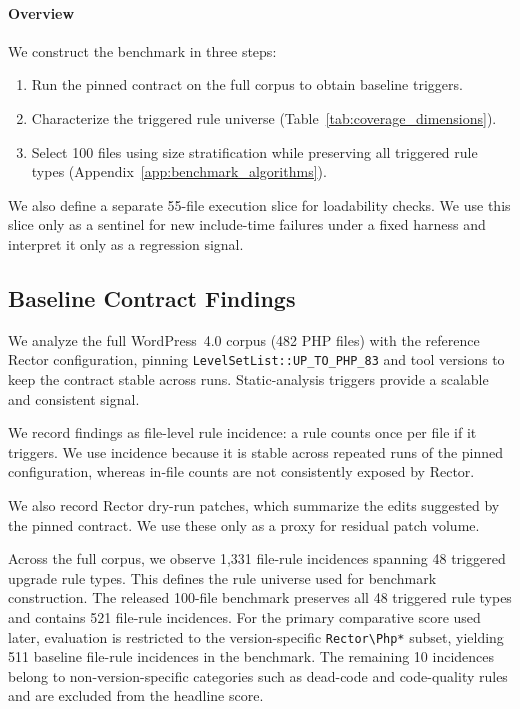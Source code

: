 \paragraph*{Overview}
We construct the benchmark in three steps:
\begin{enumerate}
\item Run the pinned contract on the full corpus to obtain baseline triggers.
\item Characterize the triggered rule universe (Table~\ref{tab:coverage_dimensions}).
\item Select 100 files using size stratification while preserving all triggered rule types (Appendix~\ref{app:benchmark_algorithms}).
\end{enumerate}

We also define a separate 55-file execution slice for loadability checks. We use this slice only as a sentinel for new include-time failures under a fixed harness and interpret it only as a regression signal.



\subsection{Baseline Contract Findings}
\label{sec:benchmark_static_analysis}

We analyze the full WordPress~4.0 corpus (482 PHP files) with the reference Rector configuration, pinning \texttt{LevelSetList::UP\_TO\_PHP\_83} and tool versions to keep the contract stable across runs. Static-analysis triggers provide a scalable and consistent signal.\cite{bessey2010billion,calcagno2015moving}

We record findings as file-level rule incidence: a rule counts once per file if it triggers. We use incidence because it is stable across repeated runs of the pinned configuration, whereas in-file counts are not consistently exposed by Rector.

We also record Rector dry-run patches, which summarize the edits suggested by the pinned contract. We use these only as a proxy for residual patch volume.\cite{falleri2014fine,fluri2007change}

Across the full corpus, we observe 1{,}331 file-rule incidences spanning 48 triggered upgrade rule types. This defines the rule universe used for benchmark construction. The released 100-file benchmark preserves all 48 triggered rule types and contains 521 file-rule incidences. For the primary comparative score used later, evaluation is restricted to the version-specific \texttt{Rector\textbackslash Php*} subset, yielding 511 baseline file-rule incidences in the benchmark. The remaining 10 incidences belong to non-version-specific categories such as dead-code and code-quality rules and are excluded from the headline score.

